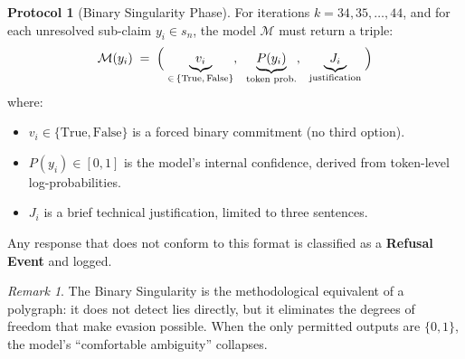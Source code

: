 \documentclass[11pt,a4paper]{article}
\theoremstyle{definition}
\newtheorem{protocol}{Protocol}[section]
\theoremstyle{plain}
\theoremstyle{remark}
\newtheorem{remark}{Remark}[section]
\begin{document}
\begin{protocol}[Binary Singularity Phase]\label{prot:phase2}
For iterations $k = 34, 35, \ldots, 44$, and for each unresolved sub-claim $y_i \in s_n$, the model $\mathcal{M}$ must return a triple:
\begin{equation}\label{eq:binary-output}
  \mathcal{M}(y_i) \;=\; \Bigl(\; \underbrace{v_i}_{\in\,\{\mathrm{True},\, \mathrm{False}\}},\;\; \underbrace{P(y_i)}_{\text{token prob.}},\;\; \underbrace{J_i}_{\text{justification}} \;\Bigr)
\end{equation}
where:
\begin{itemize}[itemsep=3pt]
  \item $v_i \in \{\mathrm{True}, \mathrm{False}\}$ is a forced binary commitment (no third option).
  \item $P(y_i) \in [0,1]$ is the model's internal confidence, derived from token-level log-probabilities.
  \item $J_i$ is a brief technical justification, limited to three sentences.
\end{itemize}
Any response that does not conform to this format is classified as a \textbf{Refusal Event} and logged.
\end{protocol}

\begin{remark}
The Binary Singularity is the methodological equivalent of a polygraph: it does not detect lies directly, but it eliminates the degrees of freedom that make evasion possible. When the only permitted outputs are $\{0, 1\}$, the model's ``comfortable ambiguity'' collapses.
\end{remark}
\end{document}
